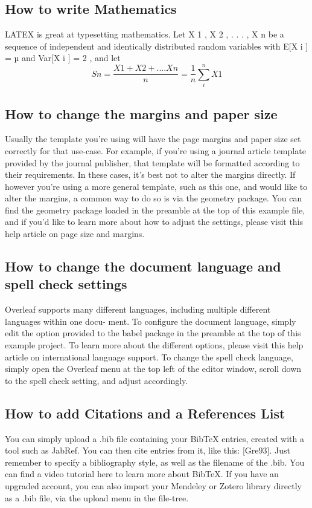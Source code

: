 \documentclass{article}
\begin{document}
 \subsection{How to write Mathematics}
LATEX is great at typesetting mathematics. Let X 1 , X 2 , . . . , X n be a sequence of independent and
identically distributed random variables with 
E[X i ] = µ and Var[X i ] = 2  , and let\\
\[
Sn=\frac{X1+X2+....Xn}{n}=\frac{1}{n}\sum_{i}^{n} X1
\]

 \subsection{How to change the margins and paper size}
 	Usually the template you’re using will have the page margins and paper size set correctly for that
 	use-case. For example, if you’re using a journal article template provided by the journal publisher,
 	that template will be formatted according to their requirements. In these cases, it’s best not to alter
 	the margins directly.
 	If however you’re using a more general template, such as this one, and would like to alter the
 	margins, a common way to do so is via the geometry package. You can find the geometry package
 	loaded in the preamble at the top of this example file, and if you’d like to learn more about how to
 	adjust the settings, please visit this help article on page size and margins.
 
 
\subsection{How to change the document language and spell check settings}
 Overleaf supports many different languages, including multiple different languages within one docu-
 ment.
 To configure the document language, simply edit the option provided to the babel package in the
 preamble at the top of this example project. To learn more about the different options, please visit
 this help article on international language support.
 To change the spell check language, simply open the Overleaf menu at the top left of the editor
 window, scroll down to the spell check setting, and adjust accordingly.

\subsection{ How to add Citations and a References List}
 You can simply upload a .bib file containing your BibTeX entries, created with a tool such as JabRef.
 You can then cite entries from it, like this: [Gre93]. Just remember to specify a bibliography style, as
 well as the filename of the .bib. You can find a video tutorial here to learn more about BibTeX.
 If you have an upgraded account, you can also import your Mendeley or Zotero library directly as
 a .bib file, via the upload menu in the file-tree.
 
\end{document}
